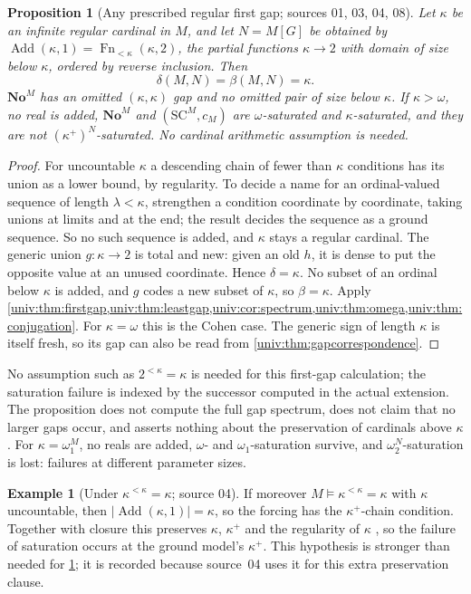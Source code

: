 \documentclass[11pt,letterpaper]{article}
\numberwithin{equation}{section}
\newtheorem{proposition}[proposition]{Proposition}
\theoremstyle{definition}
\newtheorem{example}[example]{Example}
\theoremstyle{remark}
\newcommand{\No}{\mathbf{No}}
\newcommand{\SC}{\mathrm{SC}}
\newcommand{\NoM}{\No^{M}}
\newcommand{\SCM}{\SC^{M}}
\newcommand{\Add}{\operatorname{Add}}
\newcommand{\abs}[1]{\lvert#1\rvert}
\begin{document}
\begin{proposition}[Any prescribed regular first gap; sources 01, 03, 04, 08]\label{univ:prop:add}
Let $\kappa$ be an infinite regular cardinal in $M$, and let $N=M[G]$ be
obtained by $\Add(\kappa,1)=\operatorname{Fn}_{<\kappa}(\kappa,2)$, the partial
functions $\kappa\to2$ with domain of size below $\kappa$, ordered by reverse
inclusion. Then
\[
 \delta(M,N)=\beta(M,N)=\kappa.
\]
$\NoM$ has an omitted $(\kappa,\kappa)$ gap and no omitted pair of size below
$\kappa$. If $\kappa>\omega$, no real is added, $\NoM$ and $(\SCM,c_M)$ are
$\omega$-saturated and $\kappa$-saturated, and they are not
$(\kappa^+)^N$-saturated. No cardinal arithmetic assumption is needed.
\end{proposition}
\begin{proof}
For uncountable $\kappa$ a descending chain of fewer than $\kappa$ conditions
has its union as a lower bound, by regularity. To decide a name for an
ordinal-valued sequence of length $\lambda<\kappa$, strengthen a condition
coordinate by coordinate, taking unions at limits and at the end; the result
decides the sequence as a ground sequence. So no such sequence is added, and
$\kappa$ stays a regular cardinal. The generic union $g:\kappa\to2$ is total
and new: given an old $h$, it is dense to put the opposite value at an unused
coordinate. Hence $\delta=\kappa$. No subset of an ordinal below $\kappa$ is
added, and $g$ codes a new subset of $\kappa$, so $\beta=\kappa$. Apply
\cref{univ:thm:firstgap,univ:thm:leastgap,univ:cor:spectrum,univ:thm:omega,univ:thm:conjugation}.
For $\kappa=\omega$ this is the Cohen case. The generic sign of length $\kappa$
is itself fresh, so its gap can also be read from
\cref{univ:thm:gapcorrespondence}.
\end{proof}

No assumption such as $2^{<\kappa}=\kappa$ is needed for this first-gap
calculation; the saturation failure is indexed by the successor computed in
the actual extension. The proposition does not compute the full gap spectrum,
does not claim that no larger gaps occur, and asserts nothing about the
preservation of cardinals above $\kappa$. For $\kappa=\omega_1^M$, no reals
are added, $\omega$- and $\omega_1$-saturation survive, and
$\omega_2^N$-saturation is lost: failures at different parameter sizes.

\begin{example}[Under $\kappa^{<\kappa}=\kappa$; source 04]\label{univ:ex:addkappa}
If moreover $M\models\kappa^{<\kappa}=\kappa$ with $\kappa$ uncountable, then
$\abs{\Add(\kappa,1)}=\kappa$, so the forcing has the $\kappa^+$-chain
condition. Together with closure this preserves $\kappa$, $\kappa^+$ and the
regularity of $\kappa$ \cite{Jech}, so the failure of saturation occurs at the
ground model's $\kappa^+$. This hypothesis is stronger than needed for
\cref{univ:prop:add}; it is recorded because source~04 uses it for this extra
preservation clause.
\end{example}
\end{document}
